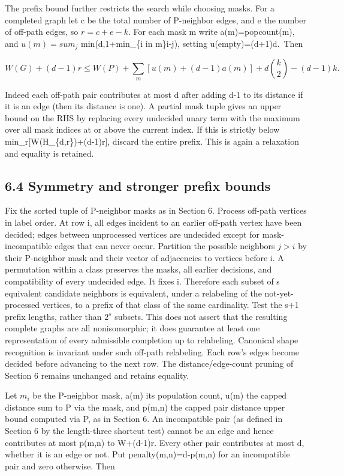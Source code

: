 \documentclass[
  11pt,
]{article}
\begin{document}
The prefix bound further restricts the search while choosing masks. For
a completed graph let c be the total number of P-neighbor edges, and e
the number of off-path edges, so \(r=c+e-k\). For each mask m write
a(m)=popcount(m), and \(u(m)=sum_{j}\) min(d,1+min\_\{i in
m\}\textbar i-j\textbar), setting u(empty)=(d+1)d.~Then

\[W(G)+(d-1)r\le W(P)+\sum_m[u(m)+(d-1)a(m)]+d\binom{k}{2}-(d-1)k.\]

Indeed each off-path pair contributes at most d after adding d-1 to its
distance if it is an edge (then its distance is one). A partial mask
tuple gives an upper bound on the RHS by replacing every undecided unary
term with the maximum over all mask indices at or above the current
index. If this is strictly below min\_r{[}W(H\_\{d,r\})+(d-1)r{]},
discard the entire prefix. This is again a relaxation and equality is
retained.

\subsection{6.4 Symmetry and stronger prefix
bounds}\label{symmetry-and-stronger-prefix-bounds}

Fix the sorted tuple of P-neighbor masks as in Section 6. Process
off-path vertices in label order. At row i, all edges incident to an
earlier off-path vertex have been decided; edges between unprocessed
vertices are undecided except for mask-incompatible edges that can never
occur. Partition the possible neighbors \(j>i\) by their P-neighbor mask
and their vector of adjacencies to vertices before i. A permutation
within a class preserves the masks, all earlier decisions, and
compatibility of every undecided edge. It fixes i. Therefore each subset
of s equivalent candidate neighbors is equivalent, under a relabeling of
the not-yet-processed vertices, to a prefix of that class of the same
cardinality. Test the s+1 prefix lengths, rather than \(2^s\) subsets.
This does not assert that the resulting complete graphs are all
nonisomorphic; it does guarantee at least one representation of every
admissible completion up to relabeling. Canonical shape recognition is
invariant under such off-path relabeling. Each row's edges become
decided before advancing to the next row. The distance/edge-count
pruning of Section 6 remains unchanged and retains equality.

Let \(m_{i}\) be the P-neighbor mask, a(m) its population count, u(m)
the capped distance sum to P via the mask, and p(m,n) the capped pair
distance upper bound computed via P, as in Section 6. An incompatible
pair (as defined in Section 6 by the length-three shortcut test) cannot
be an edge and hence contributes at most p(m,n) to W+(d-1)r. Every other
pair contributes at most d, whether it is an edge or not. Put
penalty(m,n)=d-p(m,n) for an incompatible pair and zero otherwise. Then
\end{document}
